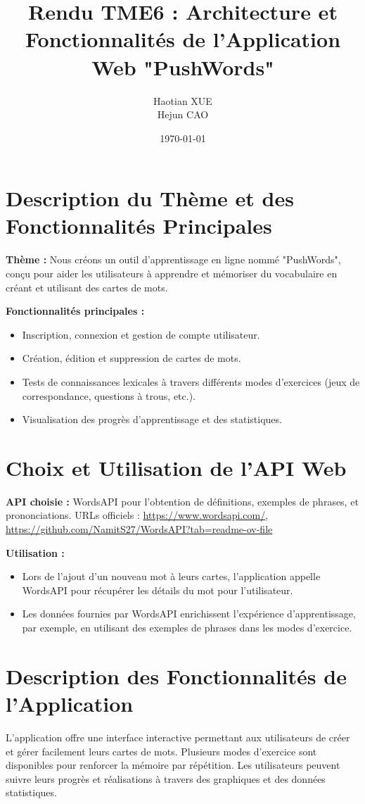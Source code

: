 \documentclass{article}
\title{Rendu TME6 : Architecture et Fonctionnalités de l'Application Web "PushWords"}
\author{Haotian XUE \\ Hejun CAO}
\date{\today}
\begin{document}
	
	\maketitle
	
	\section{Description du Thème et des Fonctionnalités Principales}
	\textbf{Thème :} Nous créons un outil d'apprentissage en ligne nommé "PushWords", conçu pour aider les utilisateurs à apprendre et mémoriser du vocabulaire en créant et utilisant des cartes de mots.
	
	\textbf{Fonctionnalités principales :}
	\begin{itemize}
		\item Inscription, connexion et gestion de compte utilisateur.
		\item Création, édition et suppression de cartes de mots.
		\item Tests de connaissances lexicales à travers différents modes d'exercices (jeux de correspondance, questions à trous, etc.).
		\item Visualisation des progrès d'apprentissage et des statistiques.
	\end{itemize}
	
	\section{Choix et Utilisation de l'API Web}
	\textbf{API choisie :} WordsAPI pour l'obtention de définitions, exemples de phrases, et prononciations. URLs officiels : \url{https://www.wordsapi.com/}, \url{https://github.com/NamitS27/WordsAPI?tab=readme-ov-file}
	
	\textbf{Utilisation :}
	\begin{itemize}
		\item Lors de l'ajout d'un nouveau mot à leurs cartes, l'application appelle WordsAPI pour récupérer les détails du mot pour l'utilisateur.
		\item Les données fournies par WordsAPI enrichissent l'expérience d'apprentissage, par exemple, en utilisant des exemples de phrases dans les modes d'exercice.
	\end{itemize}
	
	\section{Description des Fonctionnalités de l'Application}
	L'application offre une interface interactive permettant aux utilisateurs de créer et gérer facilement leurs cartes de mots. Plusieurs modes d'exercice sont disponibles pour renforcer la mémoire par répétition. Les utilisateurs peuvent suivre leurs progrès et réalisations à travers des graphiques et des données statistiques.
	
\end{document}
